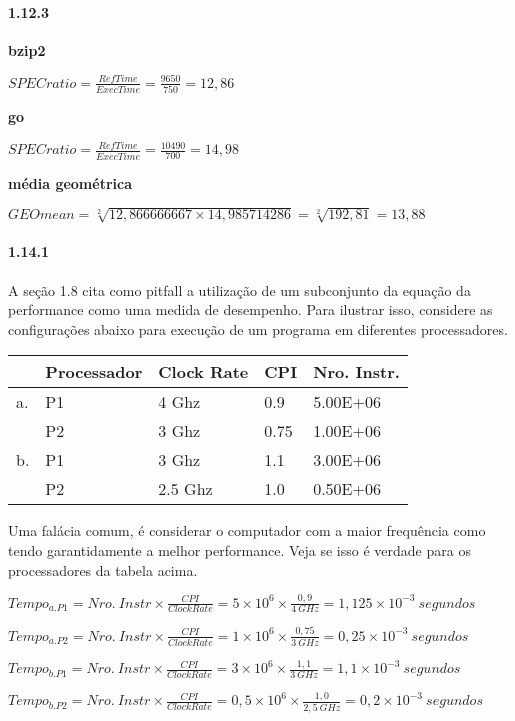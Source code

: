 \documentclass{article}
\begin{document}
\paragraph{1.12.3}

\textbf{bzip2}

$SPECratio = \frac{RefTime}{ExecTime} = \frac{9650}{750} = 12,86$

\textbf{go}

$SPECratio = \frac{RefTime}{ExecTime} = \frac{10490}{700} = 14,98$

\textbf{média geométrica}

$GEOmean = \sqrt[2]{12,866666667 \times 14,985714286} = \sqrt[2]{192,81} 
= 13,88$

\pagebreak
\paragraph{1.14.1}
A seção 1.8 cita como pitfall a utilização de um subconjunto da equação da 
performance como uma medida de desempenho. Para ilustrar isso, considere as 
configurações abaixo para execução de um programa em diferentes processadores.

\begin{tabular}{|l|l|l|l|l|}
\hline  & Processador & Clock Rate & CPI & Nro. Instr. \\
\hline a. & P1 & 4 Ghz & 0.9 & 5.00E+06 \\
\hline  & P2 & 3 Ghz & 0.75 & 1.00E+06 \\
\hline b. & P1 & 3 Ghz & 1.1 & 3.00E+06 \\
\hline  & P2 & 2.5 Ghz & 1.0 & 0.50E+06 \\
\hline
\end{tabular}

Uma falácia comum, é considerar o computador com a maior frequência como tendo 
garantidamente a melhor performance. Veja se isso é verdade para os 
processadores da tabela acima.

$Tempo_{a.P1} = Nro.\ Instr \times \frac{CPI}{Clock Rate} = 5 \times 10^{6} 
\times \frac{0,9}{4\ GHz} = 1,125 \times 10^{-3}\ segundos$

$Tempo_{a.P2} = Nro.\ Instr \times \frac{CPI}{Clock Rate} = 1 \times 10^{6} 
\times \frac{0,75}{3\ GHz} = 0,25 \times 10^{-3}\ segundos$

$Tempo_{b.P1} = Nro.\ Instr \times \frac{CPI}{Clock Rate} = 3 \times 10^{6} 
\times \frac{1,1}{3\ GHz} = 1,1 \times 10^{-3}\ segundos$

$Tempo_{b.P2} = Nro.\ Instr \times \frac{CPI}{Clock Rate} = 0,5 \times 10^{6} 
\times \frac{1,0}{2,5\ GHz} = 0,2 \times 10^{-3}\ segundos$
\end{document}
